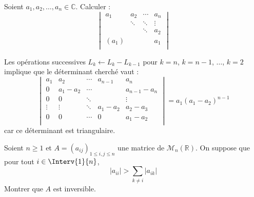 \documentclass[a4paper,10pt]{report}
\begin{document}
\begin{Exa} Soient $a_1 ,a_2 , \ldots ,a_n \in \mathbb{C}$. Calculer :
    \[
    \begin{vmatrix}
        {a_1} & {a_2} & \cdots & {a_n} \\
        {} & \ddots & \ddots & \vdots \\
        {} & {} & \ddots & {a_2} \\
        {(a_1)} & {} & {} & {a_1} \\
    \end{vmatrix}
    \]
\end{Exa}

\corr Les opérations successives $L_k \leftarrow L_k - L_{k-1}$ pour $k=n$, $k=n-1$, $\ldots$, $k=2$ implique que le déterminant cherché vaut :
$$  \begin{vmatrix}
        {a_1} & {a_2} & \cdots & a_{n-1} & {a_n} \\
        0 &  a_1-a_2 & \cdots & & a_{n-1}-a_n \\
         0& 0& \ddots & & \vdots\\
        \vdots & \vdots & \ddots& a_1-a_2 & {a_2-a_3} \\
        0 & 0 & \cdots  & 0& {a_1-a_2} \\
    \end{vmatrix} = a_1 (a_1-a_2)^{n-1}$$
 car ce déterminant est triangulaire.
 
 \begin{Exa} Soient $n \geq 1$ et $A = (a_{ij})_{1 \leq i,j \leq n}$ une matrice de $\mathcal{M}_n(\mathbb{R})$. On suppose que pour tout $i \in \Interv{1}{n}$,
$$ \vert a_{ii} \vert > \sum_{k \neq i} \vert a_{ik} \vert $$
Montrer que $A$ est inversible.
\end{Exa}
\end{document}

